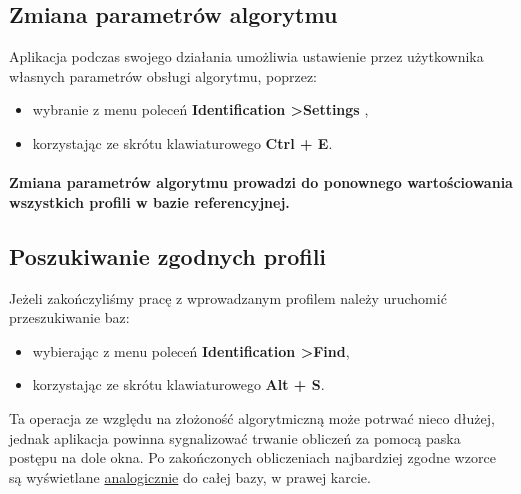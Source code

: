 \documentclass[]{article}
\begin{document}
\subsection{Zmiana parametrów algorytmu}
Aplikacja podczas swojego działania umożliwia ustawienie przez użytkownika własnych parametrów obsługi algorytmu, poprzez:
\begin{itemize}
	\item wybranie z menu poleceń \textbf{Identification \textgreater \space Settings	},
	\item korzystając ze skrótu klawiaturowego \textbf{Ctrl + E}.
\end{itemize}

\paragraph*{Zmiana parametrów algorytmu prowadzi do ponownego wartościowania wszystkich profili w bazie referencyjnej.}

\subsection{Poszukiwanie zgodnych profili}
Jeżeli zakończyliśmy pracę z wprowadzanym profilem należy uruchomić przeszukiwanie baz:
\begin{itemize}
	\item wybierając z menu poleceń \textbf{Identification \textgreater \space Find},
	\item korzystając ze skrótu klawiaturowego \textbf{Alt + S}.
\end{itemize}
Ta operacja ze względu na złożoność algorytmiczną może potrwać nieco dłużej, jednak aplikacja powinna sygnalizować trwanie obliczeń za pomocą paska postępu na dole okna. Po zakończonych obliczeniach najbardziej zgodne wzorce są wyświetlane \hyperref[sec:view]{analogicznie} do całej bazy, w prawej karcie.
\end{document}
